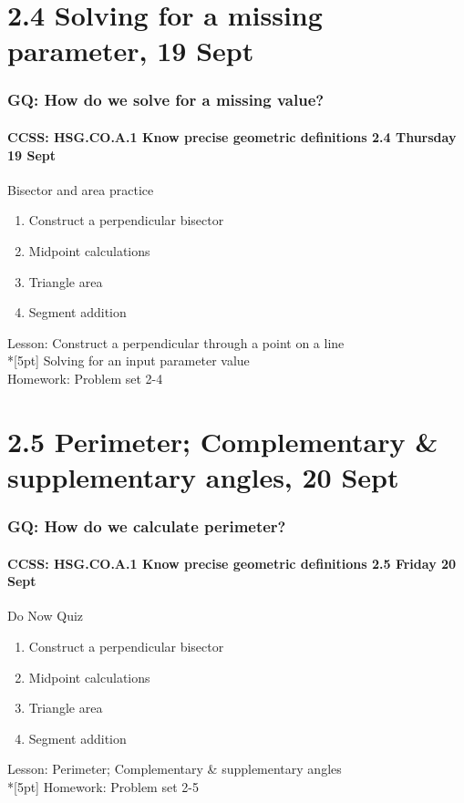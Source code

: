 \documentclass{beamer}
\begin{document}
  \section{2.4 Solving for a missing parameter, 19 Sept}
  \frame
  {
    \frametitle{GQ: How do we solve for a missing value?}
    \framesubtitle{CCSS: HSG.CO.A.1 Know precise geometric definitions \hfill \alert{2.4 Thursday 19 Sept}}

    \begin{block}{Bisector and area practice}
    \begin{enumerate}
      \item Construct a perpendicular bisector
      \item Midpoint calculations
      \item Triangle area
      \item Segment addition
    \end{enumerate}
    \end{block}
    Lesson: Construct a perpendicular through a point on a line \\*[5pt]
    Solving for an input parameter value\\ \smallskip
    Homework: Problem set 2-4 
  }

  \section{2.5 Perimeter; Complementary \& supplementary angles, 20 Sept}
  \frame
  {
    \frametitle{GQ: How do we calculate perimeter?}
    \framesubtitle{CCSS: HSG.CO.A.1 Know precise geometric definitions \hfill \alert{2.5 Friday 20 Sept}}

    \begin{block}{Do Now Quiz}
    \begin{enumerate}
      \item Construct a perpendicular bisector
      \item Midpoint calculations
      \item Triangle area
      \item Segment addition
    \end{enumerate}
    \end{block}
    Lesson: Perimeter; Complementary \& supplementary angles \\*[5pt]
    Homework: Problem set 2-5 
  }
\end{document}
